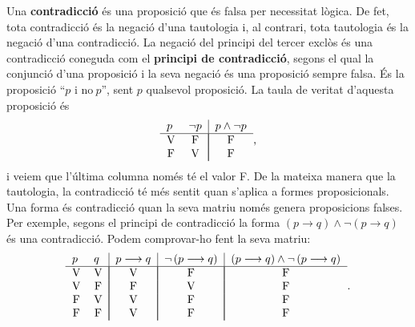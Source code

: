 Una \textbf{contradicció} és una proposició que és falsa per
necessitat lògica. De fet, tota contradicció és la negació
d'una tautologia i, al contrari, tota tautologia és la negació d'una
contradicció. La negació del principi del tercer exclòs és
una contradicció coneguda com el \textbf{principi de contradicció},
segons el qual la conjunció d'una proposició i la seva negació
és una proposició sempre falsa. És la proposició \enquote{$p$ i no$~p $}, sent $p$ qualsevol proposició. La taula de veritat d'aquesta
proposició és\begin{equation*}
\begin{tabular}{ll|l}
$p$ & $\lnot p$ & $p\wedge\lnot p$ \\ \hline
\multicolumn{1}{c}{V} & \multicolumn{1}{c|}{F} & \multicolumn{1}{|c}{F} \\
\multicolumn{1}{c}{F} & \multicolumn{1}{c|}{V} & \multicolumn{1}{|c}{F}\end{tabular}
\text{,}
\end{equation*}
i veiem que l'última columna només té el valor F. De la mateixa
manera que la tautologia, la contradicció té més sentit quan
s'aplica a formes proposicionals. Una forma és contradicció quan la
seva matriu només genera proposicions falses. Per exemple, segons el
principi de contradicció la forma $\left( p\longrightarrow q\right)
\wedge\lnot\left( p\longrightarrow q\right) $ és una contradicció.
Podem comprovar-ho fent la seva matriu:\begin{equation*}
\begin{tabular}{ll|l|l|l}
$p$ & $q$ & $p\longrightarrow q$ & $\lnot\left( p\longrightarrow q\right) $
& $(p\longrightarrow q)\wedge\lnot\left( p\longrightarrow q\right) $ \\
\hline
\multicolumn{1}{c}{V} & \multicolumn{1}{c|}{V} & \multicolumn{1}{|c|}{V} &
\multicolumn{1}{|c|}{F} & \multicolumn{1}{|c}{F} \\
\multicolumn{1}{c}{V} & \multicolumn{1}{c|}{F} & \multicolumn{1}{|c|}{F} &
\multicolumn{1}{|c|}{V} & \multicolumn{1}{|c}{F} \\
\multicolumn{1}{c}{F} & \multicolumn{1}{c|}{V} & \multicolumn{1}{|c|}{V} &
\multicolumn{1}{|c|}{F} & \multicolumn{1}{|c}{F} \\
\multicolumn{1}{c}{F} & \multicolumn{1}{c|}{F} & \multicolumn{1}{|c|}{V} &
\multicolumn{1}{|c|}{F} & \multicolumn{1}{|c}{F}\end{tabular}
\text{.}
\end{equation*}


